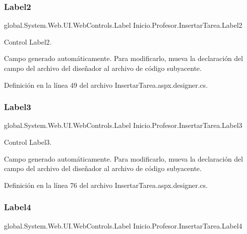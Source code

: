 \subsubsection{\texorpdfstring{Label2}{Label2}}
{\footnotesize\ttfamily global.\+System.\+Web.\+U\+I.\+Web\+Controls.\+Label Inicio.\+Profesor.\+Insertar\+Tarea.\+Label2\hspace{0.3cm}{\ttfamily [protected]}}



Control Label2. 

Campo generado automáticamente. Para modificarlo, mueva la declaración del campo del archivo del diseñador al archivo de código subyacente. 

Definición en la línea 49 del archivo Insertar\+Tarea.\+aspx.\+designer.\+cs.

\mbox{\label{classInicio_1_1Profesor_1_1InsertarTarea_abc61993bb5b9cc2aaab49fcc573937f8}} 
\subsubsection{\texorpdfstring{Label3}{Label3}}
{\footnotesize\ttfamily global.\+System.\+Web.\+U\+I.\+Web\+Controls.\+Label Inicio.\+Profesor.\+Insertar\+Tarea.\+Label3\hspace{0.3cm}{\ttfamily [protected]}}



Control Label3. 

Campo generado automáticamente. Para modificarlo, mueva la declaración del campo del archivo del diseñador al archivo de código subyacente. 

Definición en la línea 76 del archivo Insertar\+Tarea.\+aspx.\+designer.\+cs.

\mbox{\label{classInicio_1_1Profesor_1_1InsertarTarea_a972ff301ea677f3e47a024a02569c58a}} 
\subsubsection{\texorpdfstring{Label4}{Label4}}
{\footnotesize\ttfamily global.\+System.\+Web.\+U\+I.\+Web\+Controls.\+Label Inicio.\+Profesor.\+Insertar\+Tarea.\+Label4\hspace{0.3cm}{\ttfamily [protected]}}



